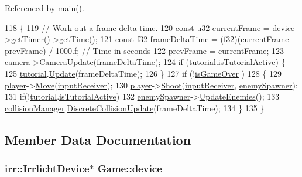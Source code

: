 Referenced by main().


\begin{DoxyCode}
118 \{
119     \textcolor{comment}{// Work out a frame delta time.}
120     \textcolor{keyword}{const} u32 currentFrame = \hyperlink{class_game_a4968552e2ba3037d494596a908eccc00}{device}->getTimer()->getTime();
121     \textcolor{keyword}{const} f32 \hyperlink{_player_8cpp_adc988571147642cda93afbf89783f9c9}{frameDeltaTime} = (f32)(currentFrame - \hyperlink{_game_8cpp_a0ff1af7dce63798c7cd58af0841a0a73}{prevFrame}) / 1000.f; \textcolor{comment}{// Time in
       seconds}
122     \hyperlink{_game_8cpp_a0ff1af7dce63798c7cd58af0841a0a73}{prevFrame} = currentFrame;
123     \hyperlink{_game_8cpp_af95833c961e5bd20dcd54e1d46a03c0b}{camera}->\hyperlink{class_camera_a76e6167aa081ea6755d0bf588cd8cb73}{CameraUpdate}(frameDeltaTime);
124     \textcolor{keywordflow}{if} (\hyperlink{_game_8cpp_ae2e07e9072887b6ad4c087d948f1a431}{tutorial}.\hyperlink{class_tutorial_a050c9844b3a52de799105883893ca073}{isTutorialActive}) \{
125         \hyperlink{_game_8cpp_ae2e07e9072887b6ad4c087d948f1a431}{tutorial}.\hyperlink{class_tutorial_a3c755730bce8d71fdd9137a048e7c732}{Update}(frameDeltaTime);
126     \}
127     \textcolor{keywordflow}{if} (!\hyperlink{class_game_a80544462b0a02a5d30d238cbe7380492}{isGameOver} )
128     \{
129         \hyperlink{class_game_abec70aa1c0269a9a7e171af4d79e08bf}{player}->\hyperlink{class_player_a436296b5c3aca2e448563594fc3eb234}{Move}(\hyperlink{_game_8cpp_ab1a0fe3a591398ca440c6d1932a73be2}{inputReceiver});
130         \hyperlink{class_game_abec70aa1c0269a9a7e171af4d79e08bf}{player}->\hyperlink{class_player_a24b813efa1554eeb30cd7e3b508bf8fd}{Shoot}(\hyperlink{_game_8cpp_ab1a0fe3a591398ca440c6d1932a73be2}{inputReceiver}, \hyperlink{_game_8cpp_a78dc0d7de0179cebaebf79df72c6070f}{enemySpawner});
131         \textcolor{keywordflow}{if}(!\hyperlink{_game_8cpp_ae2e07e9072887b6ad4c087d948f1a431}{tutorial}.\hyperlink{class_tutorial_a050c9844b3a52de799105883893ca073}{isTutorialActive})
132             \hyperlink{_game_8cpp_a78dc0d7de0179cebaebf79df72c6070f}{enemySpawner}->\hyperlink{class_enemy_spawner_ab7717d2d42a40b943564629a85f0fabc}{UpdateEnemies}();
133         \hyperlink{_game_8cpp_abed57b82902b065e35ed4bb9cbef6230}{collisionManager}.\hyperlink{class_collision_a17f9c89abcc19bfb3fe0357158dae55d}{DiscreteCollisionUpdate}(frameDeltaTime);
134     \}
135 \}
\end{DoxyCode}


\subsection{Member Data Documentation}
\hypertarget{class_game_a4968552e2ba3037d494596a908eccc00}{
\subsubsection[{device}]{\setlength{\rightskip}{0pt plus 5cm}irr\-::\-Irrlicht\-Device$\ast$ Game\-::device}}\label{class_game_a4968552e2ba3037d494596a908eccc00}


